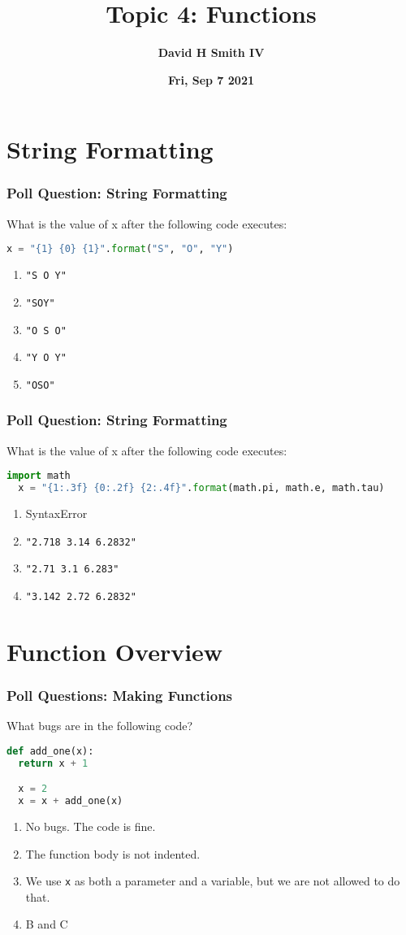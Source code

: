 \documentclass{beamer}
\title{\textbf{Topic 4: Functions}}
\author{\textbf{David H Smith IV}}
\institute[\textbf{UIUC}]{\textbf{University of Illinois Urbana-Champaign}}
\date{\textbf{Fri, Sep 7 2021}}
\begin{document}
\frame{\titlepage}

\section{String Formatting}

\begin{frame}[fragile]
  \frametitle{Poll Question: String Formatting}
  What is the value of x after the following code executes:
  \begin{lstlisting}[language=Python, autogobble] 
  x = "{1} {0} {1}".format("S", "O", "Y")
  \end{lstlisting}
  \vfill
  \begin{enumerate}[A] 
    \item \lstinline|"S O Y"|
    \item \lstinline|"SOY"|
    \item \lstinline|"O S O"| %
    \item \lstinline|"Y O Y"|
    \item \lstinline|"OSO"|
  \end{enumerate}
\end{frame}

\begin{frame}[fragile]
  \frametitle{Poll Question: String Formatting}
  What is the value of x after the following code executes:
  \begin{lstlisting}[language=Python, autogobble] 
  import math
  x = "{1:.3f} {0:.2f} {2:.4f}".format(math.pi, math.e, math.tau)
  \end{lstlisting}
  \vfill
  \begin{enumerate}[A] 
    \item SyntaxError
    \item \lstinline|"2.718 3.14 6.2832"|
    \item \lstinline|"2.71 3.1 6.283"| 
    \item \lstinline|"3.142 2.72 6.2832"|
  \end{enumerate}
\end{frame}


\section{Function Overview}
%
%
\begin{frame}[fragile]
  \frametitle{Poll Questions: Making Functions}
  What bugs are in the following code?
  \begin{lstlisting}[language=Python, autogobble]
  def add_one(x):
  return x + 1

  x = 2
  x = x + add_one(x)
  \end{lstlisting}
  \vfill
  \begin{enumerate}[A]
    \item No bugs. The code is fine.
    \item The function body is not indented.
    \item We use \lstinline|x| as both a parameter and a variable, but we are not allowed to do that.
    \item B and C
  \end{enumerate}
\end{frame}
\end{document}
